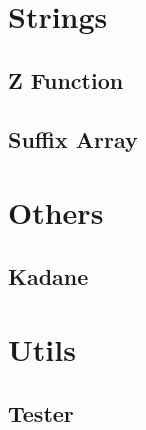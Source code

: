 \section{Strings}
\subsection{Z Function}
\raggedbottom
\vspace{-.7\baselineskip}\hrulefill
\vspace{0.1\baselineskip}\subsection{Suffix Array}
\raggedbottom
\vspace{-.7\baselineskip}\hrulefill
\vspace{0.1\baselineskip}
\section{Others}
\subsection{Kadane}
\raggedbottom
\vspace{-.7\baselineskip}\hrulefill
\vspace{0.1\baselineskip}
\section{Utils}
\subsection{Tester}
\raggedbottom
\vspace{-.7\baselineskip}\hrulefill
\vspace{0.1\baselineskip}
